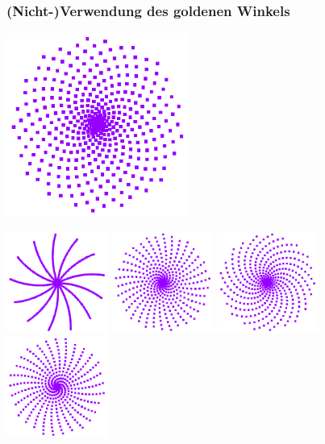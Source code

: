 \documentclass[12pt,compress,english,utf8,t]{beamer}
\begin{document}
\begin{frame}\frametitle{(Nicht-)Verwendung des goldenen Winkels}
  \centering
  \includegraphics[width=0.45\textwidth]{drehwinkel-400-1_61803398874989484820.pdf}

  \includegraphics[width=0.25\textwidth]{drehwinkel-400-1_61525621097211707043.pdf}
  \includegraphics[width=0.25\textwidth]{drehwinkel-400-1_61775621097211707043.pdf}
  \includegraphics[width=0.25\textwidth]{drehwinkel-400-1_61831176652767262597.pdf}
  \includegraphics[width=0.25\textwidth]{drehwinkel-400-1_62081176652767262597.pdf}
  \par
\end{frame}
\end{document}
